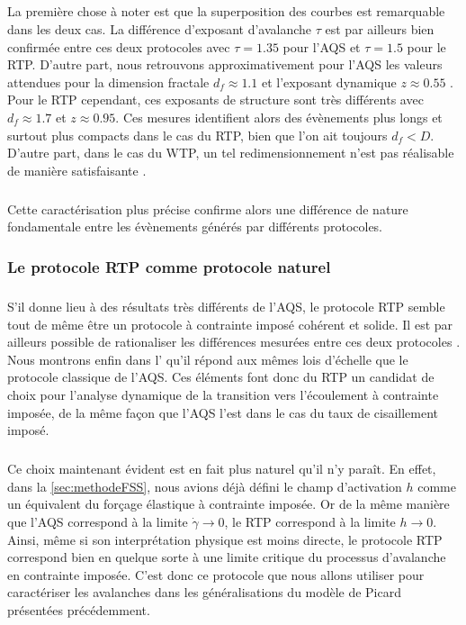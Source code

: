 \subparagraph{}La première chose à noter est que la superposition des courbes est remarquable dans les deux cas. La différence d'exposant d'avalanche $\tau$ est par ailleurs bien confirmée entre ces deux protocoles avec $\tau = 1.35$ pour l'AQS et $\tau=1.5$ pour le RTP. D'autre part, nous retrouvons approximativement pour l'AQS les valeurs attendues pour la dimension fractale $d_f\approx 1.1$ et l'exposant dynamique $z\approx 0.55$ \cite{liu_driving_2016, lin_scaling_2014}. Pour le RTP cependant, ces exposants de structure sont très différents avec $d_f \approx 1.7$ et $z\approx 0.95$. Ces mesures identifient alors des évènements plus longs et surtout plus compacts dans le cas du RTP, bien que l'on ait toujours $d_f < D$. D'autre part, dans le cas du WTP, un tel redimensionnement n'est pas réalisable de manière satisfaisante \cite{jocteur_protocol_2025}.

\subparagraph{}Cette caractérisation plus précise confirme alors une différence de nature fondamentale entre les évènements générés par différents protocoles.

\subsubsection{Le protocole RTP comme protocole naturel}

\subparagraph{}S'il donne lieu à des résultats très différents de l'AQS, le protocole RTP semble tout de même être un protocole à contrainte imposé cohérent et solide. Il est par ailleurs possible de rationaliser les différences mesurées entre ces deux protocoles \cite{jocteur_protocol_2025}. Nous montrons enfin dans l' qu'il répond aux mêmes lois d'échelle que le protocole classique de l'AQS. Ces éléments font donc du RTP un candidat de choix pour l'analyse dynamique de la transition vers l'écoulement à contrainte imposée, de la même façon que l'AQS l'est dans le cas du taux de cisaillement imposé. 

\subparagraph{}Ce choix maintenant évident est en fait plus naturel qu'il n'y paraît. En effet, dans la \autoref{sec:methodeFSS}, nous avions déjà défini le champ d'activation $h$ comme un équivalent du forçage élastique à contrainte imposée. Or de la même manière que l'AQS correspond à la limite $\dot{\gamma} \rightarrow 0$, le RTP correspond à la limite $h\rightarrow 0$. Ainsi, même si son interprétation physique est moins directe, le protocole RTP correspond bien en quelque sorte à une limite critique du processus d'avalanche en contrainte imposée. C'est donc ce protocole que nous allons utiliser pour caractériser les avalanches dans les généralisations du modèle de Picard présentées précédemment.

